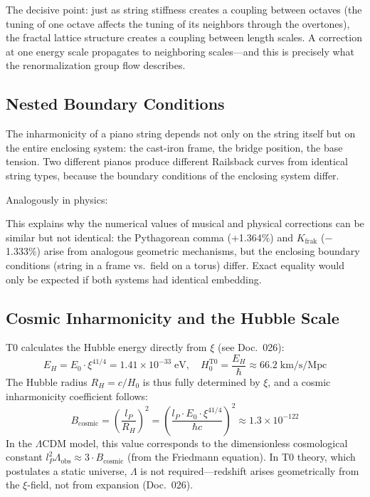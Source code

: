 The decisive point: just as string stiffness creates a coupling between octaves (the tuning of one octave affects the tuning of its neighbors through the overtones), the fractal lattice structure creates a coupling between length scales. A correction at one energy scale propagates to neighboring scales---and this is precisely what the renormalization group flow describes.

\subsection{Nested Boundary Conditions}

The inharmonicity of a piano string depends not only on the string itself but on the entire enclosing system: the cast-iron frame, the bridge position, the base tension. Two different pianos produce different Railsback curves from identical string types, because the boundary conditions of the enclosing system differ.

Analogously in physics:
\begin{center}
\end{center}

This explains why the numerical values of musical and physical corrections can be similar but not identical: the Pythagorean comma (+1.364\%) and $K_\text{frak}$ ($-$1.333\%) arise from analogous geometric mechanisms, but the enclosing boundary conditions (string in a frame vs.\ field on a torus) differ. Exact equality would only be expected if both systems had identical embedding.

\subsection{Cosmic Inharmonicity and the Hubble Scale}

T0 calculates the Hubble energy directly from $\xi$ (see Doc.~026):
\begin{equation}
	E_H = E_0 \cdot \xi^{41/4} = 1.41 \times 10^{-33}\;\text{eV}, \quad H_0^{\text{T0}} = \frac{E_H}{\hbar} \approx 66.2\;\text{km/s/Mpc}
\end{equation}
The Hubble radius $R_H = c/H_0$ is thus fully determined by $\xi$, and a cosmic inharmonicity coefficient follows:
\begin{equation}
	B_\text{cosmic} = \left(\frac{l_P}{R_H}\right)^2 = \left(\frac{l_P \cdot E_0 \cdot \xi^{41/4}}{\hbar c}\right)^2 \approx 1.3 \times 10^{-122}
\end{equation}
In the $\Lambda$CDM model, this value corresponds to the dimensionless cosmological constant $l_P^2 \Lambda_\text{obs} \approx 3 \cdot B_\text{cosmic}$ (from the Friedmann equation). In T0 theory, which postulates a static universe, $\Lambda$ is not required---redshift arises geometrically from the $\xi$-field, not from expansion (Doc.~026).

